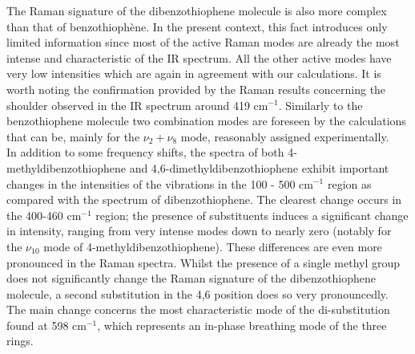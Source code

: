 	The Raman signature of the dibenzothiophene molecule is also more complex than that of benzothiophène. In the present context, this fact introduces only limited information since most of the active Raman modes are already the most intense and characteristic of the IR spectrum. All the other active modes have very low intensities which are again in agreement with our calculations. It is worth noting the confirmation provided by the Raman results concerning the shoulder observed in the IR spectrum around 419 cm$^{-1}$. 
	Similarly to the benzothiophene molecule two combination modes are foreseen by the calculations that can be, mainly for the $\nu_{2}+\nu_{8}$ mode, reasonably assigned experimentally.\\
	
	In addition to some frequency shifts, the spectra of both 4-methyldibenzothiophene and 4,6-dimethyldibenzothiophene exhibit important changes in the intensities of the vibrations in the 100 - 500 cm$^{-1}$ region as compared with the spectrum of dibenzothiophene. The clearest change occurs in the 400-460 cm$^{-1}$ region; the presence of substituents induces a significant change in intensity, ranging from very intense modes down to nearly zero (notably for the $\nu_{10}$ mode of 4-methyldibenzothiophene). These differences are even more pronounced in the Raman spectra. Whilst the presence of a single methyl group does not significantly change the Raman signature of the dibenzothiophene molecule, a second substitution in the 4,6 position does so very pronouncedly. The main change concerns the most characteristic mode of the di-substitution found at 598 cm$^{-1}$, which represents an in-phase breathing mode of the three rings.
	
